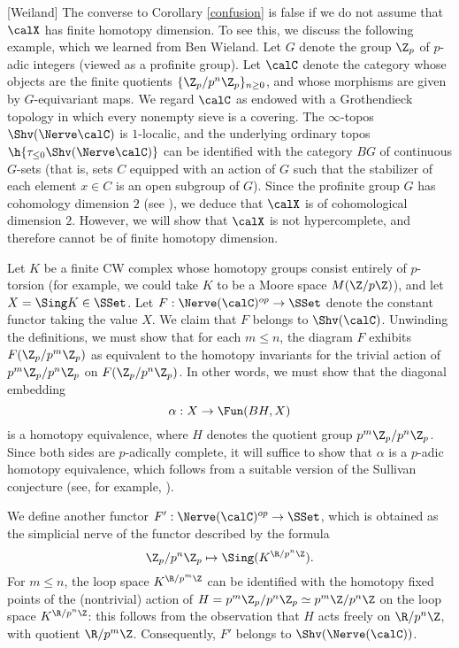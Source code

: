 \begin{warning}\label{injur}[Weiland]
The converse to Corollary \ref{confusion} is false if we do not assume that
$\calX$ has finite homotopy dimension. To see this, we discuss the following example, which
we learned from Ben Wieland. Let $G$ denote the group $\Z_{p}$ of $p$-adic integers
(viewed as a profinite group). Let $\calC$ denote the category whose objects are
the finite quotients $\{ \Z_{p} / p^{n} \Z_{p} \}_{ n \geq 0}$, and whose morphisms
are given by $G$-equivariant maps. We regard $\calC$ as endowed with a Grothendieck topology in which every nonempty sieve is a covering. The $\infty$-topos $\Shv(\Nerve \calC)$
is $1$-localic, and the underlying ordinary topos $\h{ \tau_{\leq 0} \Shv(\Nerve \calC) }$ can be identified
with the category $BG$ of continuous $G$-sets (that is, sets $C$ equipped with an action of $G$
such that the stabilizer of each element $x \in C$ is an open subgroup of $G$). Since
the profinite group $G$ has cohomology dimension $2$ (see \cite{serre}), we deduce that $\calX$ is
of cohomological dimension $2$. However, we will show that $\calX$ is not hypercomplete, and therefore cannot be of finite homotopy dimension.

Let $K$ be a finite CW complex whose homotopy groups consist entirely of $p$-torsion
(for example, we could take $K$ to be a Moore space $M( \Z/p\Z)$), and let
$X = \Sing K \in \SSet$. Let $F: \Nerve(\calC)^{op} \rightarrow \SSet$ denote the constant functor taking the value $X$. We claim that $F$ belongs to
$\Shv(\calC)$. Unwinding the definitions, we must show that for each $m \leq n$, 
the diagram $F$ exhibits $F( \Z_{p} / p^{m} \Z_p)$ as equivalent to the homotopy
invariants for the trivial action of $p^{m} \Z_{p}/ p^{n} \Z_p$ on $F( \Z_{p} / p^{n} \Z_p)$. In
other words, we must show that the diagonal embedding
$$ \alpha: X \rightarrow \Fun( BH, X)$$
is a homotopy equivalence, where $H$ denotes the quotient group
$p^{m} \Z_{p}/ p^{n} \Z_p$. Since both sides are $p$-adically complete, it will suffice
to show that $\alpha$ is a $p$-adic homotopy equivalence, which follows from a suitable version of the Sullivan conjecture (see, for example, \cite{schwartz}). 

We define another functor $F': \Nerve(\calC)^{op} \rightarrow \SSet$, which is obtained as the simplicial nerve of the functor described by the formula
$$ \Z_{p}/ p^{n} \Z_{p} \mapsto \Sing (K^{\R / p^{n} \Z}).$$
For $m \leq n$, the loop space $K^{ \R/ p^{m} \Z}$ can be identified with the homotopy
fixed points of the (nontrivial) action of $H = p^{m} \Z_{p} / p^{n} \Z_{p} \simeq p^{m} \Z / p^{n} \Z$
on the loop space $K^{ \R/ p^{n} \Z}$: this follows from the observation that $H$ acts freely on
$\R / p^{n} \Z$, with quotient $\R / p^{m} \Z$. Consequently, $F'$ belongs to $\Shv( \Nerve(\calC))$.


\end{warning}
